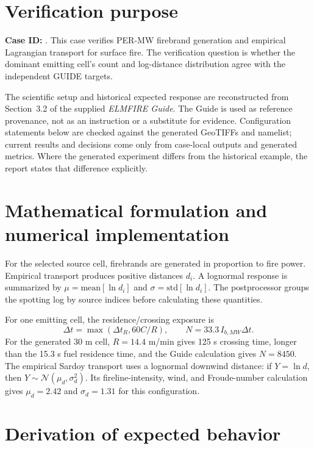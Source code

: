 \section{Verification purpose}

\textbf{Case ID:} \texttt{\CaseID}. This case verifies PER-MW firebrand generation and empirical Lagrangian transport for surface fire.  The verification question is whether the dominant emitting cell's count and log-distance distribution agree with the independent GUIDE targets.

The scientific setup and historical expected response are reconstructed from Section~3.2 of the supplied \emph{ELMFIRE Guide}. The Guide is used as reference provenance, not as an instruction or a substitute for evidence. Configuration statements below are checked against the generated GeoTIFFs and namelist; current results and decisions come only from case-local outputs and generated metrics. Where the generated experiment differs from the historical example, the report states that difference explicitly.

\section{Mathematical formulation and numerical implementation}

For the selected source cell, firebrands are generated in proportion to fire power. Empirical transport produces positive distances \(d_i\). A lognormal response is summarized by \(\mu=\mathrm{mean}[\ln d_i]\) and \(\sigma=\mathrm{std}[\ln d_i]\). The postprocessor groups the spotting log by source indices before calculating these quantities.

For one emitting cell, the residence/crossing exposure is
\begin{equation}
\Delta t=\max(\Delta t_R,60C/R), \qquad N=33.3\,I_{b,MW}\Delta t.
\end{equation}
For the generated 30 m cell, \(R=14.4\) m/min gives 125 s crossing time, longer than the 15.3 s fuel residence time, and the Guide calculation gives \(N=8450\). The empirical Sardoy transport uses a lognormal downwind distance: if \(Y=\ln d\), then \(Y\sim\mathcal{N}(\mu_d,\sigma_d^2)\). Its fireline-intensity, wind, and Froude-number calculation gives \(\mu_d=2.42\) and \(\sigma_d=1.31\) for this configuration.

\section{Derivation of expected behavior}

